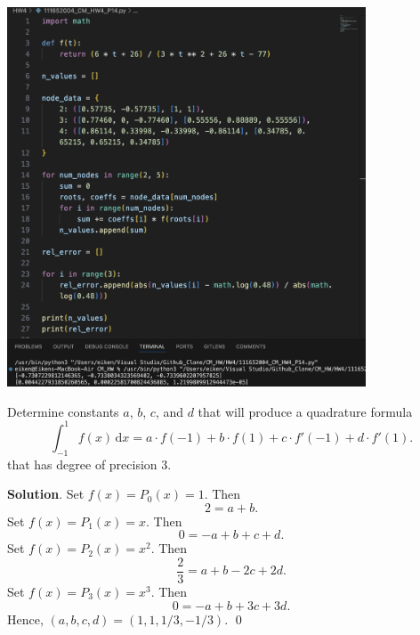 \documentclass[11pt]{article}
\theoremstyle{break}
\newcommand{\ddi}{\text{$\,$d}}
\numberwithin{equation}{theorem}
\begin{document}
\begin{center}
    \includegraphics[width=0.8\textwidth]{P14.jpg}
\end{center}


\newpage
\begin{problem}\label{problem 15} %
    Determine constants $a$, $b$, $c$, and $d$ that will produce a quadrature formula $$\int_{-1}^{1}f(x)\ddi x=a\cdot f(-1)+b\cdot f(1)+c\cdot f'(-1)+d\cdot f'(1).$$ that has degree of precision $3$.
\end{problem}
\textbf{Solution}. Set $f(x)=P_0(x)=1$. Then $$2=a+b.$$ Set $f(x)=P_1(x)=x$. Then $$0=-a+b+c+d.$$ Set $f(x)=P_2(x)=x^2$. Then $$\dfrac{2}{3}=a+b-2c+2d.$$ Set $f(x)=P_3(x)=x^3$. Then $$0=-a+b+3c+3d.$$ Hence, $(a, b, c, d)=(1, 1, 1/3, -1/3)$. \qed
\end{document}
